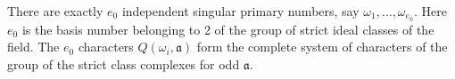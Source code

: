 There are exactly $e_0$ independent singular primary numbers, say $\omega_1, \ldots, \omega_{e_0}$. Here $e_0$ is the basis number belonging to 2 of the group of strict ideal classes of the field. The $e_0$ characters $Q(\omega_i, \mathfrak{a})$ form the complete system of characters of the group of the strict class complexes for odd $\mathfrak{a}$.

